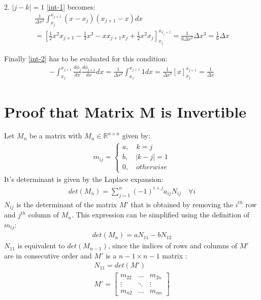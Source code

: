 2. \(|j - k| = 1\)
\ref{int-1} becomes:
\begin{gather}
\frac{1}{\Delta x^2} \int_{x_j}^{x_{j+1}} (x-x_j)(x_{j+1} - x)dx \\
= \left[ \frac{1}{2} x^2 x_{j+1} - \frac{1}{3} x^3 - x x_{j+1} x_{j} + \frac{1}{2} x^2 x_j \right]_{x_j}^{x_{x_j+1}} 
= \frac{1}{6 \Delta x^2} \Delta x^3 = \frac{1}{6} \Delta x
\end{gather}
 
Finally \ref{int-2} has to be evaluated for this condition:
\begin{gather}
-\int_{x_j}^{x_{j+1}} \frac{d\phi_{j}}{dx}\frac{d\phi_{j+1}}{dx}dx = \frac{1}{\Delta x^2} \int_{x_j}^{x_{j+1}} 1 dx =  \frac{1}{\Delta x^2} \left[ x \right]_{x_{j}}^{x_{j+1}} = \frac{1}{\Delta x}
\end{gather}
\newpage
\section{Proof that Matrix M is Invertible}
\label{ap-K-inv}
Let \(M_{n}\) be a matrix with \(M_{n} \in \mathbb{R}^{n \times n}\) given by:
\begin{gather}
m_{ij} = \begin{cases}
a, \quad k = j \\
b, \quad |k - j| = 1 \\
0, \quad otherwise 
\end{cases}
\end{gather}
It's determinant is given by the Laplace expansion:
\begin{gather}
det(M_n) = \sum_{j=1}^{n} (-1)^{i+j} a_{ij} N_{ij} \quad \forall i
\end{gather}
\(N_{ij}\) is the determinant of the matrix \(M'\) that is obtained by removing the \(i^{th}\) row and \(j^{th}\) column of \(M_n\).
This expression can be simplified using the definition of \(m_{ij}\):
\begin{gather}
det(M_n) = a N_{11} - b N_{12} \label{1}
\end{gather}
\(N_{11}\) is equivalent to \(det(M_{n-1})\), since the indices of rows and columns of \(M'\) are in consecutive order and \(M'\) is a \(n-1 \times n-1\) matrix :
\begin{gather}
N_{11} = det(M') \\
M' = \begin{bmatrix}
m_{22} & \dots & m_{2n}\\
\vdots & \ddots & \vdots \\
m_{n2} & \dots & m_{nn}
\end{bmatrix}
\end{gather}
